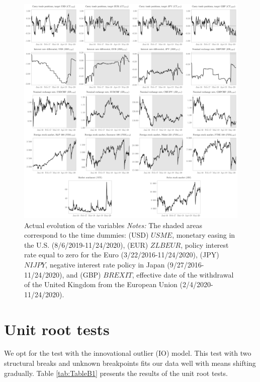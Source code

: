 \documentclass[a4paper, twoside]{templates/ociamthesis}
\begin{document}
\begin{figure}[!ht]

{\centering \includegraphics[width=0.99\columnwidth]{figure/PLOTALL-larger} 

}

\caption[Actual evolution of the variables]{Actual evolution of the variables \newline \scriptsize \textit{Notes:} The shaded areas correspond to the time dummies: (USD) $USME$, monetary easing in the U.S. (8/6/2019-11/24/2020), (EUR) $ZLBEUR$, policy interest rate equal to zero for the Euro (3/22/2016-11/24/2020), (JPY) $NIJPY$, negative interest rate policy in Japan (9/27/2016-11/24/2020), and (GBP) $BREXIT$, effective date of the withdrawal of the United Kingdom from the European Union (2/4/2020-11/24/2020).}\label{fig:FigureA1}
\end{figure}

\clearpage

\hypertarget{appendixc2}{%
\section{Unit root tests}\label{appendixc2}}

We opt for the \textcite{clemente1998} test with the innovational outlier (IO) model. This test with two structural breaks and unknown breakpoints fits our data well with means shifting gradually. Table \ref{tab:TableB1} presents the results of the unit root tests.
\end{document}

